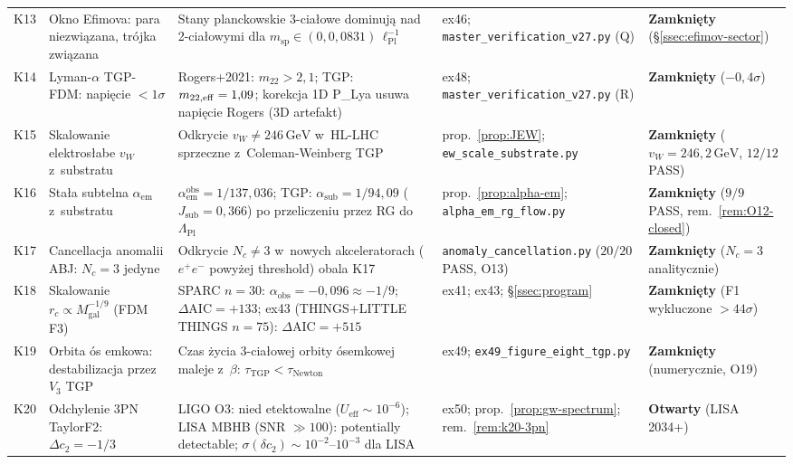 \begin{center}
\begin{tabular}{@{}c>{\raggedright}p{3.1cm}p{4.4cm}p{2.0cm}p{2.0cm}@{}}
K13 & Okno Efimova: para niezwi\k{a}zana, tr\'ojka zwi\k{a}zana
   & Stany planckowskie 3-cia\l{}owe dominuj\k{a} nad 2-cia\l{}owymi
     dla $m_{\mathrm{sp}} \in (0, 0{,}0831)\,\ell_{\mathrm{Pl}}^{-1}$
   & ex46; \texttt{master\_verification\_v27.py} (Q)
   & \textbf{Zamkni\k{e}ty} (\S\ref{ssec:efimov-sector}) \\[3pt]
K14 & Lyman-$\alpha$ TGP-FDM: napi\k{e}cie $< 1\sigma$
   & Rogers+2021: $m_{22} > 2{,}1$; TGP: $m_{22,\rm eff} = 1{,}09$;
     korekcja 1D P\_Lya usuwa napi\k{e}cie Rogers (3D artefakt)
   & ex48; \texttt{master\_verification\_v27.py} (R)
   & \textbf{Zamkni\k{e}ty} ($-0{,}4\sigma$) \\[3pt]
K15 & Skalowanie elektros\l{}abe $v_W$ z~substratu
   & Odkrycie $v_W \neq 246\,\mathrm{GeV}$ w~HL-LHC
     sprzeczne z~Coleman-Weinberg TGP
   & prop.~\ref{prop:JEW}; \texttt{ew\_scale\_substrate.py}
   & \textbf{Zamkni\k{e}ty} ($v_W = 246{,}2\,\mathrm{GeV}$, $12/12$ PASS) \\[3pt]
K16 & Sta\l{}a subtelna $\alpha_{\mathrm{em}}$ z~substratu
   & $\alpha_{\mathrm{em}}^{\mathrm{obs}} = 1/137{,}036$;
     TGP: $\alpha_{\mathrm{sub}} = 1/94{,}09$ ($J_{\mathrm{sub}} = 0{,}366$)
     po przeliczeniu przez RG do~$\Lambda_{\mathrm{Pl}}$
   & prop.~\ref{prop:alpha-em}; \texttt{alpha\_em\_rg\_flow.py}
   & \textbf{Zamkni\k{e}ty} ($9/9$ PASS, rem.~\ref{rem:O12-closed}) \\[3pt]
K17 & Cancellacja anomalii ABJ: $N_c = 3$ jedyne
   & Odkrycie $N_c \neq 3$ w~nowych akceleratorach
     ($e^+e^-$ powy\.zej threshold) obala K17
   & \texttt{anomaly\_cancellation.py} ($20/20$ PASS, O13)
   & \textbf{Zamkni\k{e}ty} ($N_c = 3$ analitycznie) \\[3pt]
K18 & Skalowanie $r_c \propto M_{\mathrm{gal}}^{-1/9}$ (FDM F3)
   & SPARC $n=30$: $\alpha_{\mathrm{obs}} = -0{,}096 \approx -1/9$;
     $\Delta\mathrm{AIC} = +133$;
     ex43 (THINGS+LITTLE THINGS $n=75$): $\Delta\mathrm{AIC} = +515$
   & ex41; ex43; \S\ref{ssec:program}
   & \textbf{Zamkni\k{e}ty} (F1 wykluczone $> 44\sigma$) \\[3pt]
K19 & Orbita \'os emkowa: destabilizacja przez $V_3$ TGP
   & Czas \.zycia 3-cia\l{}owej orbity \'osemkowej
     maleje z~$\beta$: $\tau_{\mathrm{TGP}} < \tau_{\mathrm{Newton}}$
   & ex49; \texttt{ex49\_figure\_eight\_tgp.py}
   & \textbf{Zamkni\k{e}ty} (numerycznie, O19) \\[3pt]
K20 & Odchylenie 3PN TaylorF2: $\Delta c_2 = -1/3$
   & LIGO O3: nied etektowalne ($U_{\mathrm{eff}} \sim 10^{-6}$);
     LISA MBHB (SNR $\gg 100$): potentially detectable;
     $\sigma(\delta c_2) \sim 10^{-2}$--$10^{-3}$ dla LISA
   & ex50; prop.~\ref{prop:gw-spectrum}; rem.~\ref{rem:k20-3pn}
   & \textbf{Otwarty} (LISA 2034+) \\[3pt]
\bottomrule
\end{tabular}
\end{center}


